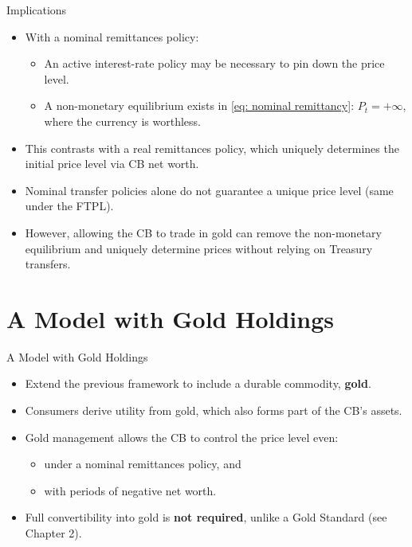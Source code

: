 \documentclass[11pt,aspectratio=169]{beamer}
\begin{document}
\begin{frame}{Implications}
\begin{itemize}
    \item With a nominal remittances policy:
    \vspace{0.15cm}
    \begin{itemize}
        \item An active interest-rate policy may be necessary to pin down the price level.
       \vspace{0.25cm} 
       \item A non-monetary equilibrium exists in \eqref{eq: nominal remittancy}: $P_t = +\infty$, where the currency is worthless.
    \end{itemize}
    \item This contrasts with a real remittances policy, which uniquely determines the initial price level via CB net worth.
       \vspace{0.25cm} 
    \item Nominal transfer policies alone do not guarantee a unique price level (same under the FTPL).
         \vspace{0.25cm} 
    \item However, allowing the CB to trade in gold can remove the non-monetary equilibrium and uniquely determine prices without relying on Treasury transfers.
\end{itemize}
\end{frame}

\section{A Model with Gold Holdings}

\begin{frame}{A Model with Gold Holdings}
\begin{itemize}
    \item Extend the previous framework to include a durable commodity, \textbf{gold}.
    \vspace{0.2cm}
    \item Consumers derive utility from gold, which also forms part of the CB's assets.
    \vspace{0.2cm}
    \item Gold management allows the CB to control the price level even:
    \begin{itemize}
        \item under a nominal remittances policy, and
        \item with periods of negative net worth.
    \end{itemize}
    \vspace{0.2cm}
    \item Full convertibility into gold is \textbf{not required}, unlike a Gold Standard (see Chapter 2).
\end{itemize}
\end{frame}
\end{document}
